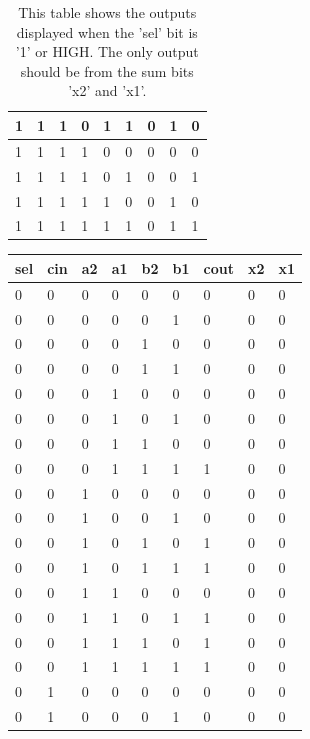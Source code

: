 \documentclass[11pt]{article}
\begin{document}
\begin{table}[H]
\begin{center}
\begin{tabular}{| l | l | l | l | l | l | l | l | l |}
		1 & 1 & 1 & 0 & 1 & 1 & 0 & 1 & 0 \\ \hline
		1 & 1 & 1 & 1 & 0 & 0 & 0 & 0 & 0 \\ \hline
		1 & 1 & 1 & 1 & 0 & 1 & 0 & 0 & 1 \\ \hline
		1 & 1 & 1 & 1 & 1 & 0 & 0 & 1 & 0 \\ \hline
		1 & 1 & 1 & 1 & 1 & 1 & 0 & 1 & 1 \\ \hline
	\end{tabular}
	\caption{\label{tab:selOneTruthTable}This table shows the outputs displayed when the 'sel' bit is '1' or HIGH. The only output should be from the sum bits 'x2' and 'x1'.}
\end{center}	
\end{table}

\begin{table}[H]
\begin{center}
	\begin{tabular}{| l | l | l | l | l | l | l | l | l |}
		\hline
		sel & cin & a2 & a1 & b2 & b1 & cout & x2 & x1 \\ \hline
		0 & 0 & 0 & 0 & 0 & 0 & 0 & 0 & 0 \\ \hline
		0 & 0 & 0 & 0 & 0 & 1 & 0 & 0 & 0 \\ \hline
		0 & 0 & 0 & 0 & 1 & 0 & 0 & 0 & 0 \\ \hline
		0 & 0 & 0 & 0 & 1 & 1 & 0 & 0 & 0 \\ \hline
		0 & 0 & 0 & 1 & 0 & 0 & 0 & 0 & 0 \\ \hline
		0 & 0 & 0 & 1 & 0 & 1 & 0 & 0 & 0 \\ \hline
		0 & 0 & 0 & 1 & 1 & 0 & 0 & 0 & 0 \\ \hline
		0 & 0 & 0 & 1 & 1 & 1 & 1 & 0 & 0 \\ \hline
		0 & 0 & 1 & 0 & 0 & 0 & 0 & 0 & 0 \\ \hline
		0 & 0 & 1 & 0 & 0 & 1 & 0 & 0 & 0 \\ \hline
		0 & 0 & 1 & 0 & 1 & 0 & 1 & 0 & 0 \\ \hline
		0 & 0 & 1 & 0 & 1 & 1 & 1 & 0 & 0 \\ \hline
		0 & 0 & 1 & 1 & 0 & 0 & 0 & 0 & 0 \\ \hline
		0 & 0 & 1 & 1 & 0 & 1 & 1 & 0 & 0 \\ \hline
		0 & 0 & 1 & 1 & 1 & 0 & 1 & 0 & 0 \\ \hline
		0 & 0 & 1 & 1 & 1 & 1 & 1 & 0 & 0 \\ \hline
		0 & 1 & 0 & 0 & 0 & 0 & 0 & 0 & 0 \\ \hline
		0 & 1 & 0 & 0 & 0 & 1 & 0 & 0 & 0 \\ \hline

\end{tabular}
\end{center}
\end{table}
\end{document}
